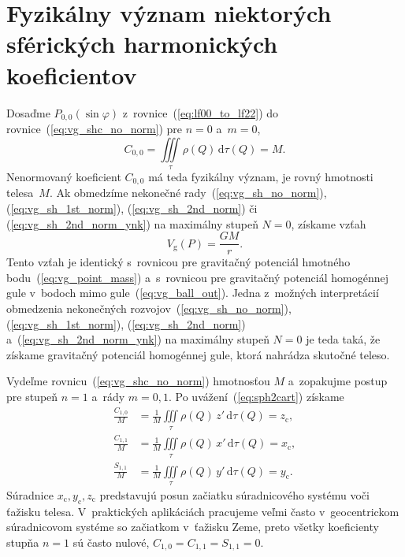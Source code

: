 \documentclass[a4paper, 12pt]{book}
\newcommand{\diff}{\mathrm d}
\newcommand{\gidx}{\mathrm g}
\begin{document}

\section{Fyzikálny význam niektorých sférických harmonických koeficientov}
\label{sec:physical_meaning_of_spherical_harmonic_coefficients}

Dosaďme $P_{0,0}(\sin\varphi)$ z~rovnice~(\ref{eq:lf00_to_lf22})
do rovnice~(\ref{eq:vg_shc_no_norm}) pre $n = 0$ a~$m = 0$,
%
\begin{equation}
\label{eq:c00_mass}
C_{0,0} = \iiint\limits_{\tau} \rho(Q) \, \diff \tau(Q) = M{.}
\end{equation}
%
Nenormovaný koeficient $C_{0,0}$ má teda fyzikálny význam, je rovný hmotnosti 
telesa~$M$.  Ak obmedzíme nekonečné rady~(\ref{eq:vg_sh_no_norm}), 
(\ref{eq:vg_sh_1st_norm}), (\ref{eq:vg_sh_2nd_norm}) či 
(\ref{eq:vg_sh_2nd_norm_ynk}) na maximálny stupeň $N = 0$, získame vzťah
%
\begin{equation}
\label{eq:vg_sh_0degree}
V_\gidx(P) = \frac{GM}{r}{.}
\end{equation}
%
Tento vzťah je identický s~rovnicou pre gravitačný potenciál hmotného 
bodu~(\ref{eq:vg_point_mass}) a~s~rovnicou pre gravitačný potenciál homogénnej 
gule v~bodoch mimo gule~(\ref{eq:vg_ball_out}).  Jedna z~možných interpretácií 
obmedzenia nekonečných rozvojov~(\ref{eq:vg_sh_no_norm}), 
(\ref{eq:vg_sh_1st_norm}), (\ref{eq:vg_sh_2nd_norm}) 
a~(\ref{eq:vg_sh_2nd_norm_ynk}) na maximálny stupeň $N = 0$ je teda taká, že 
získame gravitačný potenciál homogénnej gule, ktorá nahrádza skutočné teleso.

Vydeľme rovnicu~(\ref{eq:vg_shc_no_norm}) hmotnosťou $M$ a~zopakujme postup pre
stupeň $n = 1$ a~rády $m = 0, 1$.  Po uvážení~(\ref{eq:sph2cart}) získame
%
\begin{equation}
\begin{split}
\frac{C_{1,0}}{M} &= \frac{1}{M} \iiint\limits_{\tau} \rho(Q) \, z' \, \diff 
\tau(Q) = z_\mathrm{c}{,}\\
\frac{C_{1,1}}{M} &= \frac{1}{M} \iiint\limits_{\tau} \rho(Q) \, x' \, \diff 
\tau(Q) = x_\mathrm{c}{,}\\
\frac{S_{1,1}}{M} &= \frac{1}{M} \iiint\limits_{\tau} \rho(Q) \, y' \, \diff 
\tau(Q) = y_\mathrm{c}{.}
\end{split}
\end{equation}
%
Súradnice $x_\mathrm{c}, y_\mathrm{c}, z_\mathrm{c}$ predstavujú posun
začiatku súradnicového systému voči ťažisku telesa.  V~praktických aplikáciách 
pracujeme veľmi často v~geocentrickom súradnicovom systéme so
začiatkom v~ťažisku Zeme, preto všetky koeficienty stupňa $n = 1$ sú často 
nulové, $C_{1,0} = C_{1,1} = S_{1,1} = 0$.
\end{document}
